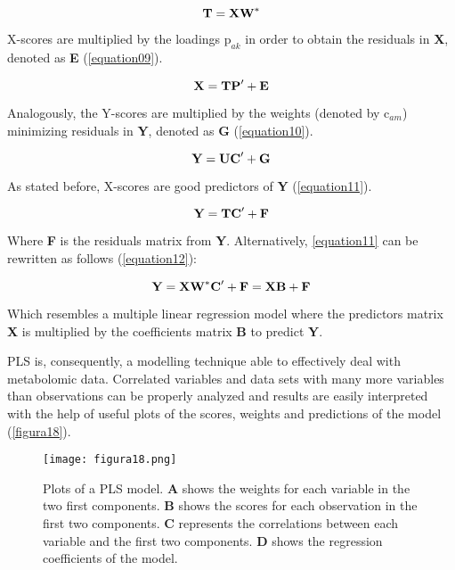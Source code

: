 \begin{equation}
\label{equation08}
\textbf{\text{T}}=\textbf{\text{XW}}^*
\end{equation}

X-scores are multiplied by the loadings $\text{p}_{ak}$ in order to obtain the residuals in \textbf{X}, denoted as \textbf{E} (\autoref{equation09}).

\begin{equation}
\label{equation09}
\textbf{\text{X}}=\textbf{\text{TP}}'+\textbf{\text{E}}
\end{equation}

Analogously, the Y-scores are multiplied by the weights (denoted by $\text{c}_{am}$) minimizing residuals in \textbf{Y}, denoted as \textbf{G} (\autoref{equation10}).

\begin{equation}
\label{equation10}
\textbf{\text{Y}}=\textbf{\text{UC}}'+\textbf{\text{G}}
\end{equation}

As stated before, X-scores are good predictors of \textbf{Y} (\autoref{equation11}).

\begin{equation}
\label{equation11}
\textbf{\text{Y}}=\textbf{\text{TC}}'+\textbf{\text{F}}
\end{equation}

Where \textbf{F} is the residuals matrix from \textbf{Y}. Alternatively, \autoref{equation11} can be rewritten as follows (\autoref{equation12}):

\begin{equation}
\label{equation12}
\textbf{\text{Y}}=\textbf{\text{XW}}^*\textbf{\text{C}}'+\textbf{\text{F}}=\textbf{\text{XB}}+\textbf{\text{F}}
\end{equation}

Which resembles a multiple linear regression model where the predictors matrix \textbf{X} is multiplied by the coefficients matrix \textbf{B} to predict \textbf{Y}.

PLS is, consequently, a modelling technique able to effectively deal with metabolomic data. Correlated variables and data sets with many more variables than observations can be properly analyzed and results are easily interpreted with the help of useful plots of the scores, weights and predictions of the model (\autoref{figura18}).

\begin{figure}[hbtp]
	\centering
\texttt{[image: figura18.png]}
\caption[Plots of a PLS model]{Plots of a PLS model. \textbf{A} shows the weights for each variable in the two first components. \textbf{B} shows the scores for each observation in the first two components. \textbf{C} represents the correlations between each variable and the first two components.  \textbf{D} shows the regression coefficients of the model.}
\label{figura18}
\end{figure}


